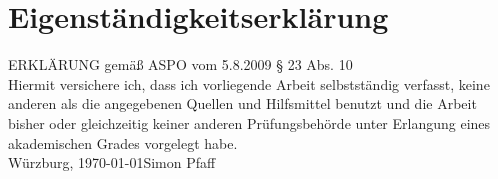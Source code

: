 \documentclass{scrartcl}
\begin{document}
\section*{Eigenständigkeitserklärung}
ERKLÄRUNG gemäß ASPO vom 5.8.2009 § 23 Abs. 10\\[10mm]
Hiermit versichere ich, dass ich vorliegende Arbeit selbstständig verfasst, keine anderen als
die angegebenen Quellen und Hilfsmittel benutzt und die Arbeit bisher oder gleichzeitig
keiner anderen Prüfungsbehörde unter Erlangung eines akademischen Grades
vorgelegt habe.\\[20mm]
Würzburg, \today \hfill Simon Pfaff
\clearpage
\end{document}
